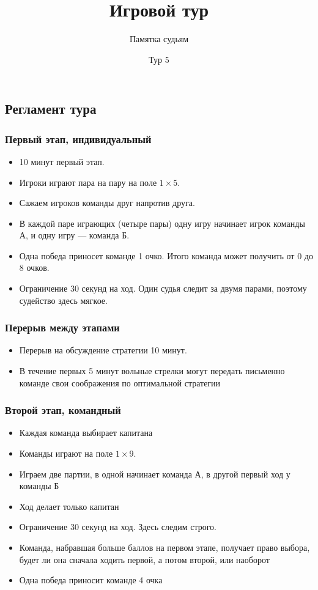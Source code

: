 \documentclass[10pt,russian,]{article}
\title{Игровой тур}
\author{Памятка судьям}
\date{Тур 5}
\providecommand{\tightlist}{%
  \setlength{\itemsep}{0pt}\setlength{\parskip}{0pt}}
\begin{document}
\maketitle

\subsection{Регламент тура}\label{-}

\subsubsection{Первый этап, индивидуальный}\label{--}

\begin{itemize}
\tightlist
\item
  10 минут первый этап.
\item
  Игроки играют пара на пару на поле \(1 \times 5\).
\item
  Сажаем игроков команды друг напротив друга.
\item
  В каждой паре играющих (четыре пары) одну игру начинает игрок команды
  А, и одну игру --- команда Б.
\item
  Одна победа приносет команде 1 очко. Итого команда может получить от 0
  до 8 очков.
\item
  Ограничение 30 секунд на ход. Один судья следит за двумя парами,
  поэтому судейство здесь мягкое.
\end{itemize}

\subsubsection{Перерыв между этапами}\label{--}

\begin{itemize}
\tightlist
\item
  Перерыв на обсуждение стратегии 10 минут.
\item
  В течение первых 5 минут вольные стрелки могут передать письменно
  команде свои соображения по оптимальной стратегии
\end{itemize}

\subsubsection{Второй этап, командный}\label{--}

\begin{itemize}
\tightlist
\item
  Каждая команда выбирает капитана
\item
  Команды играют на поле \(1 \times 9\).
\item
  Играем две партии, в одной начинает команда А, в другой первый ход у
  команды Б
\item
  Ход делает только капитан
\item
  Ограничение 30 секунд на ход. Здесь следим строго.
\item
  Команда, набравшая больше баллов на первом этапе, получает право
  выбора, будет ли она сначала ходить первой, а потом второй, или
  наоборот
\item
  Одна победа приносит команде 4 очка
\end{itemize}
\end{document}
